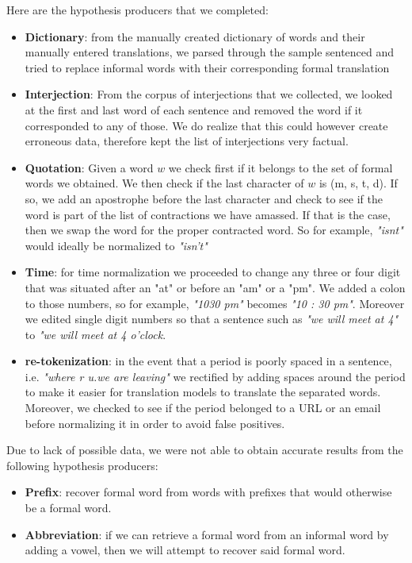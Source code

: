 \documentclass{article}
\begin{document}
Here are the hypothesis producers that we completed:
\begin{itemize}
	\item \textbf{Dictionary}: from the manually created dictionary of words and their manually entered translations, we parsed through the sample sentenced and tried to replace informal words with their corresponding formal translation
	\item \textbf{Interjection}: From the corpus of interjections that we collected, we looked at the first and last word of each sentence and removed the word if it corresponded to any of those. We do realize that this could however create erroneous data, therefore kept the list of interjections very factual.
	\item \textbf{Quotation}: Given a word $w$ we check first if it belongs to the set of formal words we obtained. We then check if the last character of $w$ is (m, s, t, d). If so, we add an apostrophe before  the last character and check to see if the word is part of the list of contractions we have amassed. If that is the case, then we swap the word for the proper contracted word. So for example, \textit{"isnt"} would ideally be normalized to \textit{"isn't"}
	\item \textbf{Time}: for time normalization we proceeded to change any three or four digit that was  situated after an "at" or before an "am" or a "pm".  We added a colon to those numbers, so for example, \textit{"1030 pm"} becomes \textit{"10 : 30 pm"}. Moreover we edited single digit numbers so that a sentence such as \textit{"we will meet at 4"} to \textit{"we will meet at 4 o'clock}.
	\item \textbf{re-tokenization}: in the event that a period is poorly spaced in a sentence, i.e. \textit{"where r u.we are leaving"} we rectified by adding spaces around the period to make it easier for translation models to translate the separated words. Moreover, we checked to see if the period belonged to a URL or an email before normalizing it in order to avoid false positives.
\end{itemize}

Due to lack of possible data, we were not able to obtain accurate results from the following hypothesis producers:
\begin{itemize}
	\item \textbf{Prefix}: recover formal word from words with prefixes that would otherwise be a formal word.
	\item \textbf{Abbreviation}: if we can retrieve a formal word from an informal word by adding a vowel, then we will attempt to recover said formal word.
\end{itemize}
\end{document}
